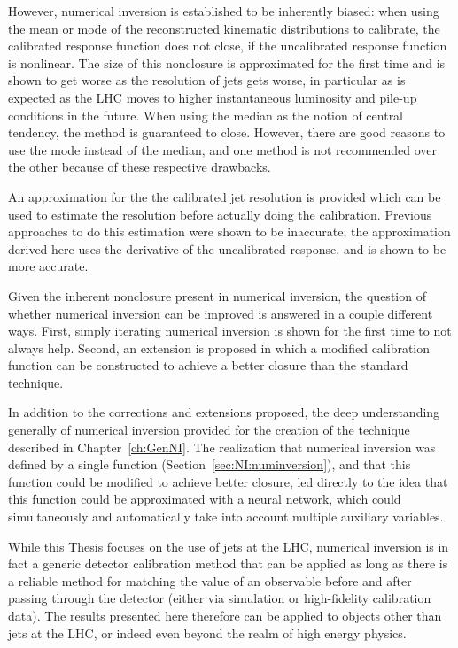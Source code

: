 However, numerical inversion is established to be inherently biased: when using the mean or mode of the reconstructed kinematic distributions to calibrate, the calibrated response function does not close, if the uncalibrated response function is nonlinear.
The size of this nonclosure is approximated for the first time and is shown to get worse as the resolution of jets gets worse, in particular as is expected as the LHC moves to higher instantaneous luminosity and pile-up conditions in the future.
When using the median as the notion of central tendency, the method is guaranteed to close.
However, there are good reasons to use the mode instead of the median, and one method is not recommended over the other because of these respective drawbacks.

An approximation for the the calibrated jet resolution is provided which can be used to estimate the resolution before actually doing the calibration.
Previous approaches to do this estimation were shown to be inaccurate; the approximation derived here uses the derivative of the uncalibrated response, and is shown to be more accurate.

Given the inherent nonclosure present in numerical inversion, the question of whether numerical inversion can be improved is answered in a couple different ways. 
First, simply iterating numerical inversion is shown for the first time to not always help.
Second, an extension is proposed in which a modified calibration function can be constructed to achieve a better closure than the standard technique.

In addition to the corrections and extensions proposed, the deep understanding generally of numerical inversion provided for the creation of the technique described in Chapter~\ref{ch:GenNI}.
The realization that numerical inversion was defined by a single function (Section~\ref{sec:NI:numinversion}), and that this function could be modified to achieve better closure, led directly to the idea that this function could be approximated with a neural network, which could simultaneously and automatically take into account multiple auxiliary variables.

While this Thesis focuses on the use of jets at the LHC, numerical inversion is in fact a generic detector calibration method that can be applied as long as there is a reliable method for matching the value of an observable before and after passing through the detector (either via simulation or high-fidelity calibration data).
The results presented here therefore can be applied to objects other than jets at the LHC, or indeed even beyond the realm of high energy physics.
